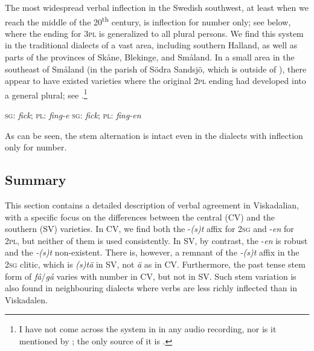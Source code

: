 \documentclass[output=paper,colorlinks,citecolor=brown,draft,draftmode]{langscibook}
\begin{document}
The most widespread verbal inflection in the Swedish southwest, at least when we reach the middle of the 20\textsuperscript{th} century, is inflection for number only; see  below, where the ending for 3\textsc{pl} is generalized to all plural persons. We find this system in the traditional dialects of a vast area, including southern Halland, as well as parts of the provinces of Skåne, Blekinge, and Småland. In a small area in the southeast of Småland (in the parish of Södra Sandsjö, which is outside of ), there appear to have existed varieties where the original 2\textsc{pl} ending had developed into a general plural; see .\footnote{I have not come across the system in  in any audio recording, nor is it mentioned by \citet{Horn2015,Horn2017}; the only source of it is \citet{Granstrom1915}.}


\ea\label{ex:petzell:24}
\ea\label{ex:petzell:24a}  \textsc{sg}:  \hspace{\tabcolsep}  \textit{fick};  \hspace{2\tabcolsep}    \textsc{pl:} \hspace{\tabcolsep}  \textit{fing-e}
\ex\label{ex:petzell:24b}  \textsc{sg}:  \hspace{\tabcolsep}  \textit{fick};  \hspace{2\tabcolsep}    \textsc{pl:} \hspace{\tabcolsep}  \textit{fing-en}
\z
\z


As can be seen, the stem alternation is intact even in the dialects with inflection only for number.


\subsection{Summary}\label{sec:petzell:3.3}


This section contains a detailed description of verbal agreement in Viskadalian, with a specific focus on the differences between the central (CV) and the southern (SV) varieties. In CV, we find both the -\textit{(s)t} affix for 2\textsc{sg} and -\textit{en} for 2\textsc{pl,} but neither of them is used consistently. In SV, by contrast, the -\textit{en} is robust and the \textit{-(s)t} non-existent. There is, however, a remnant of the \textit{-(s)t} affix in the 2\textsc{sg} clitic, which is \textit{(s)tä} in SV, not \textit{ä} as in CV. Furthermore, the past tense stem form of \textit{få}/\textit{gå} varies with number in CV, but not in SV. Such stem variation is also found in neighbouring dialects where verbs are less richly inflected than in Viskadalen.
\end{document}
